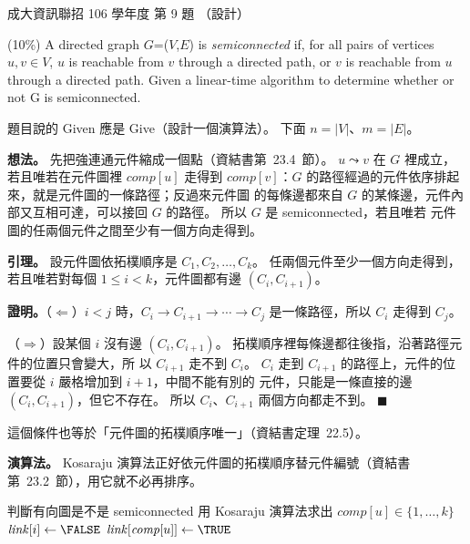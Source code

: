 \begin{pastexam}[label={px:ncku-106-prog-09}]{成大資訊聯招 106 學年度 第 9 題}
（設計）

(10\%) A directed graph $G$=($V$,$E$) is \textit{semiconnected} if, for all pairs of vertices
$u,v\in V$, $u$ is reachable from $v$ through a directed path, or $v$ is reachable from $u$ through
a directed path. Given a linear-time algorithm to determine whether or not G is semiconnected.
\end{pastexam}

\begin{pastsoln}
題目說的 Given 應是 Give（設計一個演算法）。 下面 $n = |V|$、$m = |E|$。

\textbf{想法。} 先把強連通元件縮成一個點（資結書第~23.4~節）。 $u \leadsto v$ 在 $G$ 裡成立，若且唯若在元件圖裡
$\mathit{comp}[u]$ 走得到 $\mathit{comp}[v]$：$G$ 的路徑經過的元件依序排起來，就是元件圖的一條路徑；反過來元件圖
的每條邊都來自 $G$ 的某條邊，元件內部又互相可達，可以接回 $G$ 的路徑。 所以 $G$ 是 semiconnected，若且唯若
元件圖的任兩個元件之間至少有一個方向走得到。

\textbf{引理。} 設元件圖依拓樸順序是 $C_1, C_2, \ldots, C_k$。 任兩個元件至少一個方向走得到，若且唯若對每個
$1 \le i < k$，元件圖都有邊 $(C_i, C_{i+1})$。

\textbf{證明。}（$\Leftarrow$）$i < j$ 時，$C_i \to C_{i+1} \to \cdots \to C_j$ 是一條路徑，所以 $C_i$ 走得到 $C_j$。

（$\Rightarrow$）設某個 $i$ 沒有邊 $(C_i, C_{i+1})$。 拓樸順序裡每條邊都往後指，沿著路徑元件的位置只會變大，所
以 $C_{i+1}$ 走不到 $C_i$。 $C_i$ 走到 $C_{i+1}$ 的路徑上，元件的位置要從 $i$ 嚴格增加到 $i + 1$，中間不能有別的
元件，只能是一條直接的邊 $(C_i, C_{i+1})$，但它不存在。 所以 $C_i$、$C_{i+1}$ 兩個方向都走不到。 \hfill$\blacksquare$

這個條件也等於「元件圖的拓樸順序唯一」（資結書定理~22.5）。

\textbf{演算法。} Kosaraju 演算法正好依元件圖的拓樸順序替元件編號（資結書第~23.2~節），用它就不必再排序。

\begin{pseudo}{判斷有向圖是不是 semiconnected}
    \State 用 Kosaraju 演算法求出 $\mathit{comp}[u] \in \{1, \ldots, k\}$ 
        \State $\mathit{link}[i] \gets \FALSE$
    \EndFor
            \State $\mathit{link}[\mathit{comp}[u]] \gets \TRUE$ 
        \EndIf
    \EndFor
            \State \Return \FALSE
        \EndIf
    \EndFor
    \State \Return \TRUE
\EndFunction
\end{pseudo}


\end{pastsoln}

